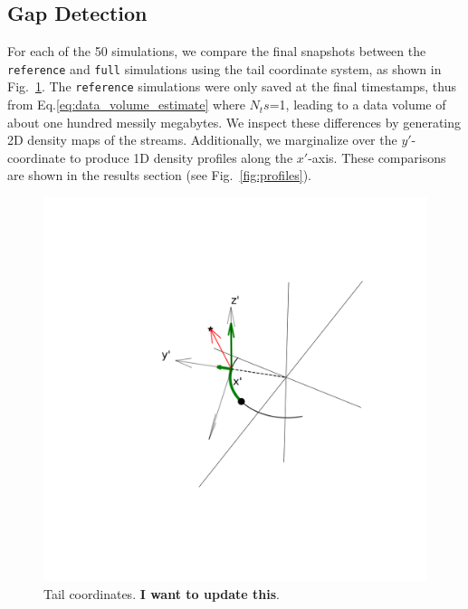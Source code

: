 \documentclass{aa}
\begin{document}
\begin{appendix}
  
  
  \section{Gap Detection} \label{sec:gap_detection}
    For each of the 50 simulations, we compare the final snapshots between the \texttt{reference} and \texttt{full} simulations using the tail coordinate system, as shown in Fig.~\ref{fig:TailCoordinates}. The \texttt{reference} simulations were only saved at the final timestamps, thus from Eq.\ref{eq:data_volume_estimate} where $N_ts$=1, leading to a data volume of about one hundred messily megabytes. We inspect these differences by generating 2D density maps of the streams. Additionally, we marginalize over the $y'$-coordinate to produce 1D density profiles along the $x'$-axis. These comparisons are shown in the results section (see Fig.~\ref{fig:profiles}).
    \begin{figure}
      \centering
      \includegraphics[width=\linewidth]{along_orbit_coordinate_system-approved.png}
      \caption{Tail coordinates. \textbf{I want to update this}. }
      \label{fig:TailCoordinates}
    \end{figure}
  

\end{appendix}
\end{document}
